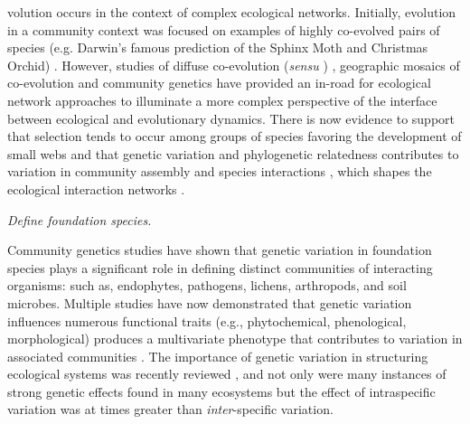 \documentclass[11pt,twocolumn,twoside,lineno]{pnas-new}
\begin{document}
volution occurs in the context of complex ecological
networks. Initially, evolution in a community context was focused on
examples of highly co-evolved pairs of species (e.g. Darwin's famous
prediction of the Sphinx Moth and Christmas Orchid)
\cite{Wade2007TheCommunities}. However, studies of diffuse
co-evolution (\textit{sensu} \cite{Janzen1980SpecificityForest})
\cite{StinchcombeCanHerbivores, Strauss2008EvolutionSize}, geographic
mosaics of co-evolution \cite{Thompson2013} and community genetics
\cite{Whitham2006a} have provided an in-road for ecological network
approaches \cite{Smith2015b, Keith2017, Lau2016GenotypicEvolution} to
illuminate a more complex perspective of the interface between
ecological and evolutionary dynamics. There is now evidence to support
that selection tends to occur among groups of species
\cite{Wade2007TheCommunities} favoring the development of small webs
\cite{Guimaraes2007InteractionNetworks, Gomez2009LocalMosaic} and that
genetic variation and phylogenetic relatedness contributes to
variation in community assembly \cite{Crutsinger2016} and species
interactions \cite{Whitham2006a, Bailey2009a, Moya-Larano2011}, which
shapes the ecological interaction networks \cite{Rezende2007}.

\textit{Define foundation species.}

Community genetics studies \cite{Lamit2015a} have shown that genetic
variation in foundation species \cite{Ellison2005} plays a significant
role in defining distinct communities of interacting organisms:  such
as, endophytes, pathogens, lichens, arthropods, and soil
microbes. Multiple studies have now demonstrated that genetic
variation influences numerous functional traits (e.g., phytochemical,
phenological, morphological) produces a multivariate phenotype
\cite{holeski2012} that contributes to variation in associated
communities \cite{Bailey2009a}. The importance of genetic variation in
structuring ecological systems was recently reviewed
\cite{DesRoches2018TheVariation}, and not only were many instances of
strong genetic effects found in many ecosystems but the effect of
intraspecific variation was at times greater than
\textit{inter}-specific variation.
\end{document}

